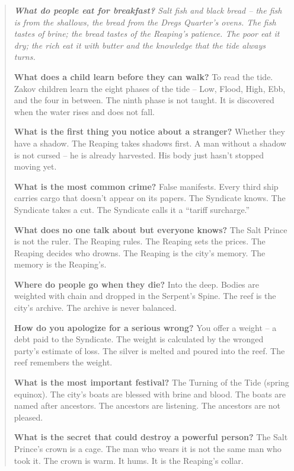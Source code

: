 \documentclass[12pt,oneside]{book}
\newenvironment{almanac}
  {\begin{quote}\small\itshape}
  {\end{quote}}
\begin{document}
\vspace{1em}
\begin{almanac}
\textbf{What do people eat for breakfast?} Salt fish and black bread -- the fish is from the shallows, the bread from the Dregs Quarter's ovens. The fish tastes of brine; the bread tastes of the Reaping's patience. The poor eat it dry; the rich eat it with butter and the knowledge that the tide always turns.

\textbf{What does a child learn before they can walk?} To read the tide. Zakov children learn the eight phases of the tide -- Low, Flood, High, Ebb, and the four in between. The ninth phase is not taught. It is discovered when the water rises and does not fall.

\textbf{What is the first thing you notice about a stranger?} Whether they have a shadow. The Reaping takes shadows first. A man without a shadow is not cursed -- he is already harvested. His body just hasn't stopped moving yet.

\textbf{What is the most common crime?} False manifests. Every third ship carries cargo that doesn't appear on its papers. The Syndicate knows. The Syndicate takes a cut. The Syndicate calls it a ``tariff surcharge.''

\textbf{What does no one talk about but everyone knows?} The Salt Prince is not the ruler. The Reaping rules. The Reaping sets the prices. The Reaping decides who drowns. The Reaping is the city's memory. The memory is the Reaping's.

\textbf{Where do people go when they die?} Into the deep. Bodies are weighted with chain and dropped in the Serpent's Spine. The reef is the city's archive. The archive is never balanced.

\textbf{How do you apologize for a serious wrong?} You offer a weight -- a debt paid to the Syndicate. The weight is calculated by the wronged party's estimate of loss. The silver is melted and poured into the reef. The reef remembers the weight.

\textbf{What is the most important festival?} The Turning of the Tide (spring equinox). The city's boats are blessed with brine and blood. The boats are named after ancestors. The ancestors are listening. The ancestors are not pleased.

\textbf{What is the secret that could destroy a powerful person?} The Salt Prince's crown is a cage. The man who wears it is not the same man who took it. The crown is warm. It hums. It is the Reaping's collar.
\end{almanac}
\end{document}
